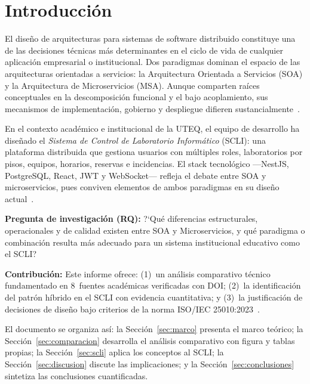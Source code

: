 \documentclass[conference,a4paper]{IEEEtran}
\begin{document}
\IEEEpeerreviewmaketitle

\section{Introducci\'on}

El dise\~no de arquitecturas para sistemas de software distribuido
constituye una de las decisiones t\'ecnicas m\'as determinantes en el
ciclo de vida de cualquier aplicaci\'on empresarial o institucional.
Dos paradigmas dominan el espacio de las arquitecturas orientadas a
servicios: la Arquitectura Orientada a Servicios (SOA) y la Arquitectura
de Microservicios (MSA). Aunque comparten ra\'ices conceptuales en la
descomposici\'on funcional y el bajo acoplamiento, sus mecanismos de
implementaci\'on, gobierno y despliegue difieren
sustancialmente~\cite{aksakalli2021,alshuqayran2016}.

En el contexto acad\'emico e institucional de la UTEQ, el equipo de
desarrollo ha dise\~nado el \textit{Sistema de Control de Laboratorio
Inform\'atico} (SCLI): una plataforma distribuida que gestiona usuarios
con m\'ultiples roles, laboratorios por pisos, equipos, horarios, reservas
e incidencias. El stack tecnol\'ogico ---NestJS, PostgreSQL, React, JWT y
WebSocket--- refleja el debate entre SOA y microservicios, pues conviven
elementos de ambos paradigmas en su dise\~no actual~\cite{waseem2021}.

\textbf{Pregunta de investigaci\'on (RQ):} ?`Qu\'e diferencias
estructurales, operacionales y de calidad existen entre SOA y
Microservicios, y qu\'e paradigma o combinaci\'on resulta m\'as
adecuado para un sistema institucional educativo como el SCLI?

\textbf{Contribuci\'on:} Este informe ofrece: (1)~un an\'alisis
comparativo t\'ecnico fundamentado en 8~fuentes acad\'emicas verificadas
con DOI; (2)~la identificaci\'on del patr\'on h\'ibrido en el SCLI con
evidencia cuantitativa; y (3)~la justificaci\'on de decisiones de
dise\~no bajo criterios de la norma ISO/IEC 25010:2023~\cite{iso25010}.

El documento se organiza as\'i: la Secci\'on~\ref{sec:marco} presenta
el marco te\'orico; la Secci\'on~\ref{sec:comparacion} desarrolla el
an\'alisis comparativo con figura y tablas propias; la
Secci\'on~\ref{sec:scli} aplica los conceptos al SCLI; la
Secci\'on~\ref{sec:discusion} discute las implicaciones; y la
Secci\'on~\ref{sec:conclusiones} sintetiza las conclusiones cuantificadas.

\end{document}
